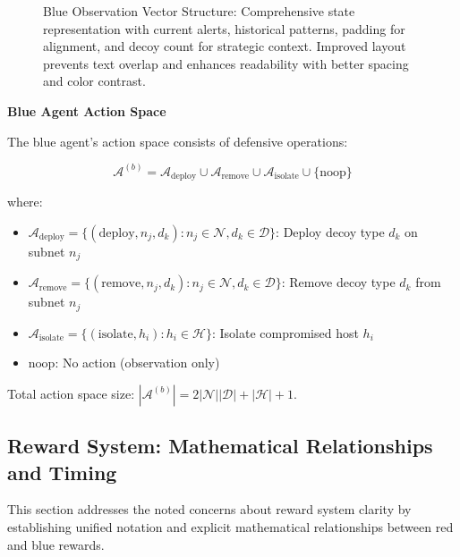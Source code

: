 \documentclass[12pt,oneside]{article}
\begin{document}
\begin{figure}[htbp]
\caption{Blue Observation Vector Structure: Comprehensive state representation with current alerts, historical patterns, padding for alignment, and decoy count for strategic context. Improved layout prevents text overlap and enhances readability with better spacing and color contrast.}
\label{fig:observation_vector}
\end{figure}

\textbf{Blue Agent Action Space}

The blue agent's action space consists of defensive operations:

\begin{equation}
\mathcal{A}^{(b)} = \mathcal{A}_{\text{deploy}} \cup \mathcal{A}_{\text{remove}} \cup \mathcal{A}_{\text{isolate}} \cup \{\text{noop}\}
\end{equation}

where:
\begin{itemize}
    \item $\mathcal{A}_{\text{deploy}} = \{(\text{deploy}, n_j, d_k) : n_j \in \mathcal{N}, d_k \in \mathcal{D}\}$: Deploy decoy type $d_k$ on subnet $n_j$
    \item $\mathcal{A}_{\text{remove}} = \{(\text{remove}, n_j, d_k) : n_j \in \mathcal{N}, d_k \in \mathcal{D}\}$: Remove decoy type $d_k$ from subnet $n_j$
    \item $\mathcal{A}_{\text{isolate}} = \{(\text{isolate}, h_i) : h_i \in \mathcal{H}\}$: Isolate compromised host $h_i$
    \item $\text{noop}$: No action (observation only)
\end{itemize}

Total action space size: $|\mathcal{A}^{(b)}| = 2|\mathcal{N}||\mathcal{D}| + |\mathcal{H}| + 1$.

\subsection{Reward System: Mathematical Relationships and Timing}

This section addresses the noted concerns about reward system clarity by establishing unified notation and explicit mathematical relationships between red and blue rewards.
\end{document}
